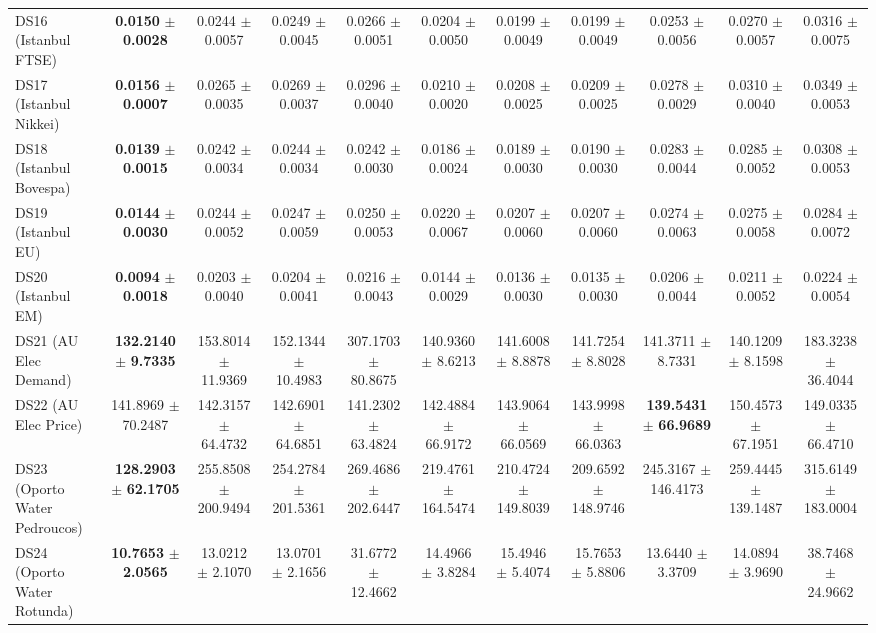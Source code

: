\begin{table}[t]
{{\begin{tabular}{lcccccccccc}
DS16 (Istanbul FTSE) & \textbf{0.0150} $\pm$ \textbf{0.0028} & 0.0244 $\pm$ 0.0057 & 0.0249 $\pm$ 0.0045 & 0.0266 $\pm$ 0.0051 & 0.0204 $\pm$ 0.0050 & 0.0199 $\pm$ 0.0049 & 0.0199 $\pm$ 0.0049 & 0.0253 $\pm$ 0.0056 & 0.0270 $\pm$ 0.0057 & 0.0316 $\pm$ 0.0075 \\
DS17 (Istanbul Nikkei) & \textbf{0.0156} $\pm$ \textbf{0.0007} & 0.0265 $\pm$ 0.0035 & 0.0269 $\pm$ 0.0037 & 0.0296 $\pm$ 0.0040 & 0.0210 $\pm$ 0.0020 & 0.0208 $\pm$ 0.0025 & 0.0209 $\pm$ 0.0025 & 0.0278 $\pm$ 0.0029 & 0.0310 $\pm$ 0.0040 & 0.0349 $\pm$ 0.0053 \\
DS18 (Istanbul Bovespa) & \textbf{0.0139} $\pm$ \textbf{0.0015} & 0.0242 $\pm$ 0.0034 & 0.0244 $\pm$ 0.0034 & 0.0242 $\pm$ 0.0030 & 0.0186 $\pm$ 0.0024 & 0.0189 $\pm$ 0.0030 & 0.0190 $\pm$ 0.0030 & 0.0283 $\pm$ 0.0044 & 0.0285 $\pm$ 0.0052 & 0.0308 $\pm$ 0.0053 \\
DS19 (Istanbul EU) & \textbf{0.0144} $\pm$ \textbf{0.0030} & 0.0244 $\pm$ 0.0052 & 0.0247 $\pm$ 0.0059 & 0.0250 $\pm$ 0.0053 & 0.0220 $\pm$ 0.0067 & 0.0207 $\pm$ 0.0060 & 0.0207 $\pm$ 0.0060 & 0.0274 $\pm$ 0.0063 & 0.0275 $\pm$ 0.0058 & 0.0284 $\pm$ 0.0072 \\
DS20 (Istanbul EM) & \textbf{0.0094} $\pm$ \textbf{0.0018} & 0.0203 $\pm$ 0.0040 & 0.0204 $\pm$ 0.0041 & 0.0216 $\pm$ 0.0043 & 0.0144 $\pm$ 0.0029 & 0.0136 $\pm$ 0.0030 & 0.0135 $\pm$ 0.0030 & 0.0206 $\pm$ 0.0044 & 0.0211 $\pm$ 0.0052 & 0.0224 $\pm$ 0.0054 \\
DS21 (AU Elec Demand) & \textbf{132.2140} $\pm$ \textbf{9.7335} & 153.8014 $\pm$ 11.9369 & 152.1344 $\pm$ 10.4983 & 307.1703 $\pm$ 80.8675 & 140.9360 $\pm$ 8.6213 & 141.6008 $\pm$ 8.8878 & 141.7254 $\pm$ 8.8028 & 141.3711 $\pm$ 8.7331 & 140.1209 $\pm$ 8.1598 & 183.3238 $\pm$ 36.4044 \\
DS22 (AU Elec Price) & 141.8969 $\pm$ 70.2487 & 142.3157 $\pm$ 64.4732 & 142.6901 $\pm$ 64.6851 & 141.2302 $\pm$ 63.4824 & 142.4884 $\pm$ 66.9172 & 143.9064 $\pm$ 66.0569 & 143.9998 $\pm$ 66.0363 & \textbf{139.5431} $\pm$ \textbf{66.9689} & 150.4573 $\pm$ 67.1951 & 149.0335 $\pm$ 66.4710 \\
DS23 (Oporto Water Pedroucos) & \textbf{128.2903} $\pm$ \textbf{62.1705} & 255.8508 $\pm$ 200.9494 & 254.2784 $\pm$ 201.5361 & 269.4686 $\pm$ 202.6447 & 219.4761 $\pm$ 164.5474 & 210.4724 $\pm$ 149.8039 & 209.6592 $\pm$ 148.9746 & 245.3167 $\pm$ 146.4173 & 259.4445 $\pm$ 139.1487 & 315.6149 $\pm$ 183.0004 \\
DS24 (Oporto Water Rotunda) & \textbf{10.7653} $\pm$ \textbf{2.0565} & 13.0212 $\pm$ 2.1070 & 13.0701 $\pm$ 2.1656 & 31.6772 $\pm$ 12.4662 & 14.4966 $\pm$ 3.8284 & 15.4946 $\pm$ 5.4074 & 15.7653 $\pm$ 5.8806 & 13.6440 $\pm$ 3.3709 & 14.0894 $\pm$ 3.9690 & 38.7468 $\pm$ 24.9662 \\
\bottomrule
\end{tabular}%
}%
}
\end{table}
